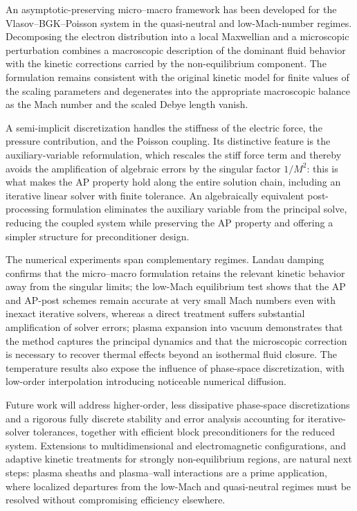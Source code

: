 \documentclass[pdflatex,final,10pt]{article}
\newenvironment{del}
  {}
  {}
\begin{document}
\begin{del}
    An asymptotic-preserving micro--macro framework has been developed for the
Vlasov--BGK--Poisson system in the quasi-neutral and low-Mach-number regimes.
Decomposing the electron distribution into a local Maxwellian and a microscopic
perturbation combines a macroscopic description of the dominant fluid behavior
with the kinetic corrections carried by the non-equilibrium component. The
formulation remains consistent with the original kinetic model for finite values
of the scaling parameters and degenerates into the appropriate macroscopic
balance as the Mach number and the scaled Debye length vanish.

A semi-implicit discretization handles the stiffness of the electric force, the
pressure contribution, and the Poisson coupling. Its distinctive feature is the
auxiliary-variable reformulation, which rescales the stiff force term and thereby
avoids the amplification of algebraic errors by the singular factor $1/M^2$: this
is what makes the AP property hold along the entire solution chain, including an
iterative linear solver with finite tolerance. An algebraically equivalent
post-processing formulation eliminates the auxiliary variable from the principal
solve, reducing the coupled system while preserving the AP property and offering
a simpler structure for preconditioner design.

The numerical experiments span complementary regimes. Landau damping confirms
that the micro--macro formulation retains the relevant kinetic behavior away from
the singular limits; the low-Mach equilibrium test shows that the AP and AP-post
schemes remain accurate at very small Mach numbers even with inexact iterative
solvers, whereas a direct treatment suffers substantial amplification of solver
errors; plasma expansion into vacuum demonstrates that the method captures the
principal dynamics and that the microscopic correction is necessary to recover
thermal effects beyond an isothermal fluid closure. The temperature results also
expose the influence of phase-space discretization, with low-order interpolation
introducing noticeable numerical diffusion.

Future work will address higher-order, less dissipative phase-space
discretizations and a rigorous fully discrete stability and error analysis
accounting for iterative-solver tolerances, together with efficient block
preconditioners for the reduced system. Extensions to multidimensional and
electromagnetic configurations, and adaptive kinetic treatments for strongly
non-equilibrium regions, are natural next steps: plasma sheaths and
plasma--wall interactions are a prime application, where localized departures
from the low-Mach and quasi-neutral regimes must be resolved without
compromising efficiency elsewhere.
\end{del}
\end{document}
